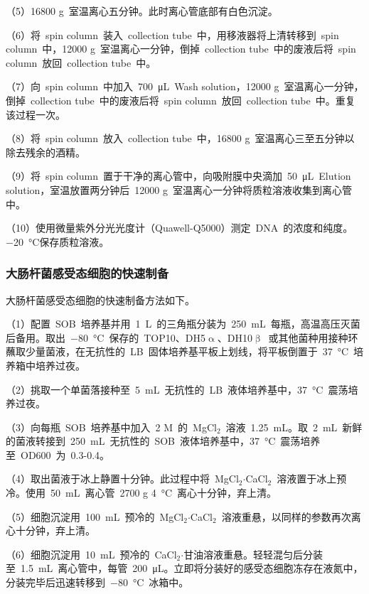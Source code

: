 （5）16800 g\ 室温离心五分钟。此时离心管底部有白色沉淀。

（6）将\ spin column\ 装入\ collection tube\ 中，用移液器将上清转移到\ spin column\ 中，12000 g\ 室温离心一分钟，倒掉\ collection tube\ 中的废液后将\ spin column\ 放回\ collection tube\ 中。

（7）向\ spin column\ 中加入\ \SI{700}{\uL}\ Wash solution，12000 g\ 室温离心一分钟，倒掉\ collection tube\ 中的废液后将\ spin column\ 放回\ collection tube\ 中。重复该过程一次。

（8）将\ spin column\ 放入\ collection tube\ 中，16800 g\ 室温离心三至五分钟以除去残余的酒精。

（9）将\ spin column\ 置于干净的离心管中，向吸附膜中央滴加\ \SI{50}{\uL}\ Elution solution，室温放置两分钟后\ 12000 g\ 室温离心一分钟将质粒溶液收集到离心管中。

（10）使用微量紫外分光光度计（Quawell-Q5000）测定\ DNA\ 的浓度和纯度。\SI{-20}{\degreeCelsius}保存质粒溶液。

\subsubsection{大肠杆菌感受态细胞的快速制备}
大肠杆菌感受态细胞的快速制备方法如下。

（1）配置\ SOB\ 培养基并用\ \SI{1}{\L}\ 的三角瓶分装为\ \SI{250}{\mL}\ 每瓶，高温高压灭菌后备用。取出\ \SI{-80}{\degreeCelsius}\ 保存的\ TOP10、DH5$\upalpha$、DH10$\upbeta$\ 或其他菌种用接种环蘸取少量菌液，在无抗性的\ LB\ 固体培养基平板上划线，将平板倒置于\ \SI{37}{\degreeCelsius}\ 培养箱中培养过夜。

（2）挑取一个单菌落接种至\ \SI{5}{\mL}\ 无抗性的\ LB\ 液体培养基中，\SI{37}{\degreeCelsius}\ 震荡培养过夜。

（3）向每瓶\ SOB\ 培养基中加入\ 2 M\ 的\ MgCl$_2$\ 溶液\ \SI{1.25}{\mL}。取\ \SI{2}{\mL}\ 新鲜的菌液转接到\ \SI{250}{\mL}\ 无抗性的\ SOB\ 液体培养基中，\SI{37}{\degreeCelsius}\ 震荡培养至\ OD600\ 为\ 0.3-0.4。

（4）取出菌液于冰上静置十分钟。此过程中将\ MgCl$_2$$\cdot$CaCl$_2$\ 溶液置于冰上预冷。使用\ \SI{50}{\mL}\ 离心管\ 2700 g \SI{4}{\degreeCelsius}\ 离心十分钟，弃上清。

（5）细胞沉淀用\ \SI{100}{\mL}\ 预冷的\ MgCl$_2$$\cdot$CaCl$_2$\ 溶液重悬，以同样的参数再次离心十分钟，弃上清。

（6）细胞沉淀用\ \SI{10}{\mL}\ 预冷的\ CaCl$_2$$\cdot$甘油溶液重悬。轻轻混匀后分装至\ \SI{1.5}{\mL}\ 离心管中，每管\ \SI{200}{\uL}。立即将分装好的感受态细胞冻存在液氮中，分装完毕后迅速转移到\ \SI{-80}{\degreeCelsius}\ 冰箱中。

